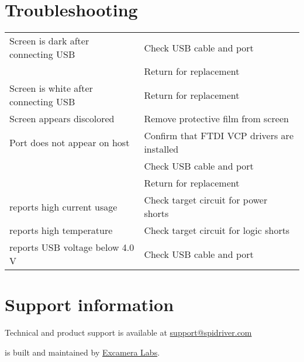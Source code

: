 \section{Troubleshooting}

\gap
\begin{tabular}{|l|l|}
\hline
Screen is dark after connecting USB  & Check USB cable and port \\
                                     & Return for replacement \\
\hline
Screen is white after connecting USB & Return for replacement \\
\hline
Screen appears discolored            & Remove protective film from screen\\
\hline
Port does not appear on host         & Confirm that FTDI VCP drivers are installed \\
                                     & Check USB cable and port \\
                                     & Return for replacement \\
\hline
\device{} reports high current usage & Check target circuit for power shorts\\
\hline
\device{} reports high temperature   & Check target circuit for logic shorts\\
\hline
\device{} reports USB voltage below 4.0 V & Check USB cable and port \\
\hline
\end{tabular}
\gap

\section{Support information}

Technical and product support is available at
\href{mailto:support@spidriver.com}{support@spidriver.com}

\device{} is built and maintained by
\href{https://excamera.com}{Excamera Labs}.

